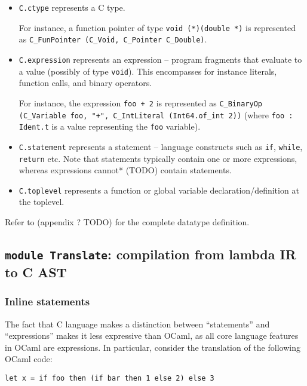 \documentclass[12pt,a4paper,twoside,openright]{report}
\begin{document}
\begin{itemize}
  \item
    \lstinline!C.ctype! represents a C type.
    
    For instance, a function pointer of type \lstinline!void (*)(double *)! is represented as \lstinline!C_FunPointer (C_Void, C_Pointer C_Double)!.
  \item
    \lstinline!C.expression! represents an expression -- program fragments that evaluate to a value (possibly of type \lstinline!void!). This encompasses for instance literals, function calls, and binary operators.

    For instance, the expression \lstinline!foo + 2! is represented as \lstinline!C_BinaryOp (C_Variable foo, "+", C_IntLiteral (Int64.of_int 2))! (where \lstinline!foo : Ident.t! is a value representing the \lstinline!foo! variable).

	\item
		\lstinline!C.statement! represents a statement -- language constructs such as \lstinline!if!, \lstinline!while!, \lstinline!return! etc. Note that statements typically contain one or more expressions, whereas expressions cannot* (TODO) contain statements.

	\item
		\lstinline!C.toplevel! represents a function or global variable declaration/definition at the toplevel.
\end{itemize}

Refer to (appendix ? TODO) for the complete datatype definition.

\subsection{\lstinline!module Translate!: compilation from lambda IR to C AST}

\subsubsection{Inline statements}

The fact that C language makes a distinction between ``statements'' and ``expressions'' makes it less expressive than OCaml, as all core language features in OCaml are expressions. In particular, consider the translation of the following OCaml code:

\begin{lstlisting}
let x = if foo then (if bar then 1 else 2) else 3
\end{lstlisting}
\end{document}
